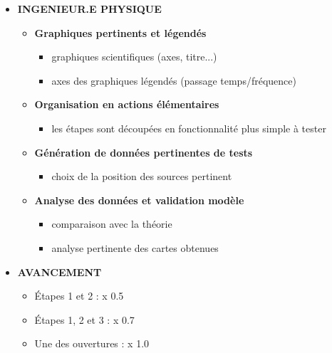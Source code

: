 \begin{itemize}
	\item \textbf{INGENIEUR.E PHYSIQUE}
	\begin{itemize}
		\item \textbf{Graphiques pertinents et légendés}
		\begin{itemize}
			\item graphiques scientifiques (axes, titre...)
			\item axes des graphiques légendés (passage temps/fréquence)
		\end{itemize}		 
		\item \textbf{Organisation en actions élémentaires}
		\begin{itemize}
			\item les étapes sont découpées en fonctionnalité plus simple à tester
		\end{itemize}
		\item \textbf{Génération de données pertinentes de tests}
		\begin{itemize}
			\item choix de la position des sources pertinent
		\end{itemize}
		\item \textbf{Analyse des données et validation modèle}
		\begin{itemize}
			\item comparaison avec la théorie
			\item analyse pertinente des cartes obtenues
		\end{itemize}
	\end{itemize}
	
\medskip	
	
	\item \textbf{AVANCEMENT}
	\begin{itemize}
		\item Étapes 1 et 2 : x 0.5
		\item Étapes 1, 2 et 3 : x 0.7
		\item Une des ouvertures : x 1.0
	\end{itemize}
\end{itemize}



